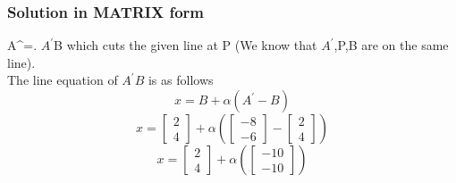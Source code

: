 \documentclass{beamer}
\begin{document}

\begin{frame}
\frametitle{Solution in MATRIX form}
A^{\prime}=\left[ 
  \begin{array}{ c }
     -8\\
     -6
  \end{array} \right].
  \newline {} $A^{\prime}$B which cuts the given line at P (We know that $A^{\prime}$,P,B are on the same line).
 \\The line equation of $A^{\prime}B$ is as follows 
 $$ x = B+ \alpha(A^{\prime}-B)$$
  \[ x= \left[ 
  \begin{array}{ c  }
     2\\
     4
  \end{array} \right]+\alpha(\left[ 
  \begin{array}{ c  }
     -8\\
     -6
  \end{array} \right] - \left[ 
  \begin{array}{ c  }
     2\\
     4
  \end{array} \right])\]
  \[ x= \left[ 
  \begin{array}{ c  }
     2\\
     4
  \end{array} \right]+\alpha(\left[ 
  \begin{array}{ c  }
     -10\\
     -10
  \end{array} \right])
  \]
\end{frame}
\end{document}
